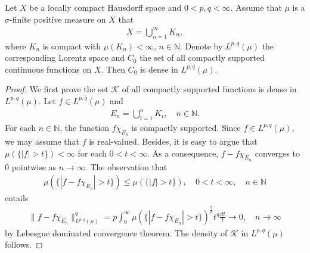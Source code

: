 \documentclass[10pt,a4paper]{amsart}
\begin{document}
\begin{proposition}\label{lorentz dense}
Let $X$ be a locally compact Hausdorff space and $0<p,q<\infty$. Assume that $\mu$ is a $\sigma$-finite positive measure on $X$ that
\begin{align*}
X=\bigcup_{n=1}^{\infty}K_{n},
\end{align*}
where $K_{n}$ is compact with $\mu(K_{n})<\infty$, $n\in\mathbb{N}$. Denote by $L^{p,q}(\mu)$ the corresponding Lorentz space and $C_{0}$ the set of all compactly supported continuous functions on $X$. Then $C_{0}$ is dense in $L^{p,q}(\mu)$.
\end{proposition}

\begin{proof}
We first prove the set $\mathcal{K}$ of all compactly supported functions is dense in $L^{p,q}(\mu)$. Let $f\in L^{p,q}(\mu)$ and 
\begin{align*}
E_{n}=\bigcup_{i=1}^{n}K_{i},\quad n\in\mathbb{N}.
\end{align*}
For each $n\in\mathbb{N}$, the function $f\chi_{E_{n}}$ is compactly supported. Since $f\in L^{p,q}(\mu)$, we may assume that $f$ is real-valued. Besides, it is easy to argue that $\mu(\{|f|>t\})<\infty$ for each $0<t<\infty$. As a consequence,  $f-f\chi_{E_{n}}$ converges to $0$ pointwise as $n\rightarrow\infty$. The observation that 
\begin{align*}
\mu(\{|f-f\chi_{E_{n}}|>t\})\leq\mu(\{|f|>t\}),\quad 0<t<\infty,\quad n\in\mathbb{N}
\end{align*}
entails
\begin{align*}
\|f-f\chi_{E_{n}}\|_{L^{p,q}(\mu)}^{q}=p\int_{0}^{\infty}\mu(\{|f-f\chi_{E_{n}}|>t\})^{\frac{q}{p}}t^{q}\frac{dt}{t}\rightarrow 0,\quad n\rightarrow\infty
\end{align*}
by Lebesgue dominated convergence theorem. The density of $\mathcal{K}$ in $L^{p,q}(\mu)$ follows.


\end{proof}
\end{document}
